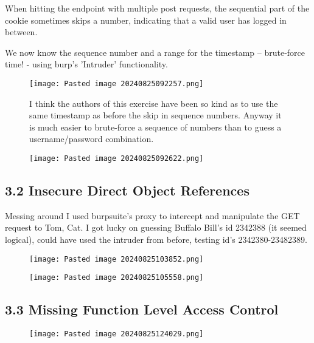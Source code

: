 \documentclass[
	letterpaper, %
	10pt, %
	unnumberedsections, %
	twoside, %
]{APAAssignment}
\begin{document}
\begin{appendices}
When hitting the endpoint with multiple post requests, the sequential part of the cookie sometimes skips a number, indicating that a valid user has logged in between.

We now know the sequence number and a range for the timestamp -- brute-force time! - using burp's 'Intruder' functionality. 


\begin{figure} %
	\texttt{[image: Pasted image 20240825092257.png]}
	\caption{I think the authors of this exercise have been so kind as to use the same timestamp as before the skip in sequence numbers. 
	Anyway it is much easier to brute-force a sequence of numbers than to guess a username/password combination.
	}
	\label{fig:HijackCookieSolved}
\end{figure}

\begin{figure} %
	\texttt{[image: Pasted image 20240825092622.png]}
	\caption{}
	\label{fig:HijackCookieSolvedCheck}
\end{figure}


\subsection{3.2 Insecure Direct Object References}
Messing around I used burpsuite's proxy to intercept and manipulate the GET request to Tom, Cat. I got lucky on guessing Buffalo Bill's id 2342388 (it seemed logical), could have used the intruder from before, testing id's 2342380-23482389.   

\begin{figure} %
	\texttt{[image: Pasted image 20240825103852.png]}
	\caption{}
	\label{fig:HijackCookieSolvedCheck}
\end{figure}


\begin{figure} %
	\texttt{[image: Pasted image 20240825105558.png]}
	\caption{}
	\label{fig:HijackCookieSolvedCheck}
\end{figure}


\subsection{3.3 Missing Function Level Access Control}


\begin{figure} %
	\texttt{[image: Pasted image 20240825124029.png]}
	\caption{}
	\label{fig:HijackCookieSolvedCheck}
\end{figure}





\end{appendices}
\end{document}
